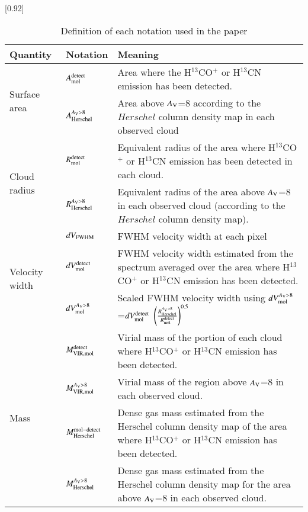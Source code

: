 \begin{table*}
\tiny
\scalebox{0.92}[0.92]{
\centering
\begin{threeparttable}
\caption{Definition of each notation used in the paper\label{list_symbols}}
\begin{tabular}{|l|l|l|}
\hline
Quantity & Notation & Meaning \\
\hline
\multirow{2}{*}{Surface area}  & $A_{\rm mol}^{\rm detect}$ & Area where the H$^{13}$CO$^+$ or H$^{13}$CN emission has been detected.\\
                                 & $A_{\rm Herschel}^{A_{\rm V}>8}$ & Area above $A_{\rm V}$=8 according to the $Herschel$ column density map in each observed cloud \\
\hline
\multirow{2}{*}{Cloud radius}  & $R_{\rm mol}^{\rm detect}$ & Equivalent radius of the area where H$^{13}$CO$^+$ or H$^{13}$CN emission has been detected in each cloud.\\
                                 & $R_{\rm Herschel}^{A_{\rm V}>8}$ & Equivalent radius of the area above $A_{\rm V}$=8 in each observed cloud (according to the $Herschel$ column density map). \\
\hline
\multirow{3}{*}{Velocity width}  & $dV_{\rm FWHM}$ & FWHM velocity width at each pixel\\
                         & $dV_{\rm mol}^{\rm detect}$ & FWHM velocity width estimated from the spectrum averaged over the area where H$^{13}$CO$^+$ or H$^{13}$CN emission has been detected.  \\
                         & $dV_{\rm mol}^{A_{\rm V}>8}$ & Scaled FWHM velocity width using $dV_{\rm mol}^{A_{\rm V}>8}$=$dV_{\rm mol}^{\rm detect}$ $\left(\frac{R_{\rm Herschel}^{A_{\rm V}>8}}{R_{\rm mol}^{\rm detect}}\right)^{0.5}$ \\
\hline
\multirow{5}{*}{Mass} & $M_{\rm VIR,mol}^{\rm detect}$           &  Virial mass of the portion of each cloud where H$^{13}$CO$^+$ or H$^{13}$CN emission has been detected. \\
         & $M_{\rm VIR,mol}^{A_{\rm V}>8}$  &   Virial mass of the region above $A_{\rm V}$=8 in each observed cloud.   \\
         & $M_{\rm Herschel}^{\rm mol-detect}$  &  Dense gas mass estimated from the Herschel column density map of the area where H$^{13}$CO$^+$ or H$^{13}$CN emission has been detected.  \\
         & $M_{\rm Herschel}^{A_{\rm V}>8}$ &  Dense gas mass estimated from the Herschel column density map for the area above $A_{\rm V}$=8 in each observed cloud.   \\

\end{tabular}
\end{threeparttable}}
\end{table*}
